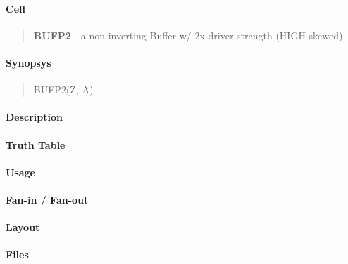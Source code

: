 \label{BUFP2}
\paragraph{Cell}
\begin{quote}
    \textbf{BUFP2} - a non-inverting Buffer w/ 2x driver strength (HIGH-skewed)
\end{quote}

\paragraph{Synopsys}
\begin{quote}
    BUFP2(Z, A)
\end{quote}

\paragraph{Description}



\paragraph{Truth Table}
%

\paragraph{Usage}

\paragraph{Fan-in / Fan-out}

\paragraph{Layout}

\paragraph{Files}

